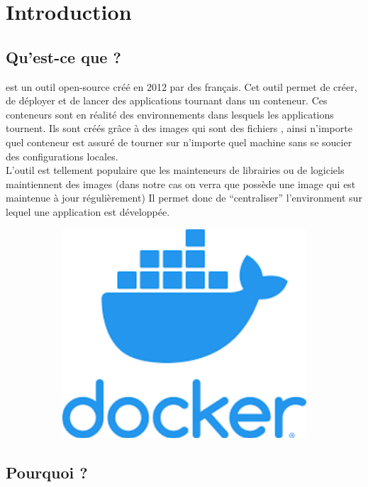 \section[Introduction]{Introduction}

\subsection[Qu'est-ce que Docker?]{Qu'est-ce que \docker{}?}
    
    \docker{} est un outil open-source créé en 2012 par des français. Cet outil permet de créer, de déployer et de lancer des applications tournant dans un conteneur. Ces conteneurs sont en réalité des environnements dans lesquels les applications tournent.
    Ils sont créés grâce à des images qui sont des fichiers \docker{}, ainsi n'importe quel conteneur est assuré de tourner sur n'importe quel machine sans se soucier des configurations locales.\\
    L'outil est tellement populaire que les mainteneurs de librairies ou de logiciels maintiennent des images \docker{} (dans notre cas on verra que \laravelsail{} possède une image \docker{} qui est maintenue à jour régulièrement)
    Il permet donc de ``centraliser'' l'environment sur lequel une application est développée. 

    \begin{figure}[h]
        \centering
        \begin{subfigure}[b]{0.3\textwidth}
            \includegraphics[scale=0.4]{Images_formation/LogoDocker.pdf}
        \end{subfigure}%
    \end{figure}
    
\subsection[Pourquoi Docker?]{Pourquoi \docker{}?}

